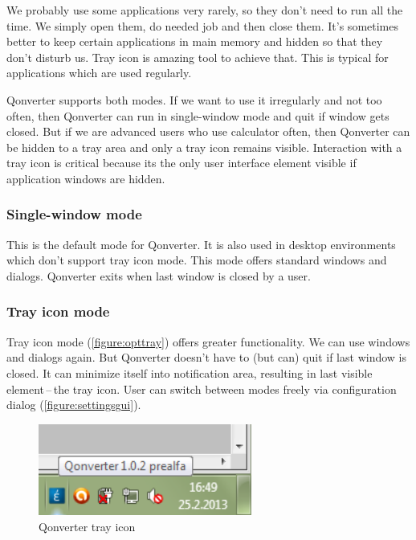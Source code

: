 We probably use some applications very rarely, so they don't need to run all the time. We simply open them, do needed job and then close them. It's sometimes better to keep certain applications in main memory and hidden so that they don't disturb us. Tray icon is amazing tool to achieve that. This is typical for applications which are used regularly.

Qonverter supports both modes. If we want to use it irregularly and not too often, then Qonverter can run in single-window mode and quit if window gets closed. But if we are advanced users who use calculator often, then Qonverter can be hidden to a tray area and only a tray icon remains visible. Interaction with a tray icon is critical because its the only user interface element visible if application windows are hidden.

\subsubsection{Single-window mode}
This is the default mode for Qonverter. It is also used in desktop environments which don't support tray icon mode. This mode offers standard windows and dialogs. Qonverter exits when last window is closed by a user.

\subsubsection{Tray icon mode}
Tray icon mode (\autoref{figure:opttray}) offers greater functionality. We can use windows and dialogs again. But Qonverter doesn't have to (but can) quit if last window is closed. It can minimize itself into notification area, resulting in last visible element\,--\,the tray icon. User can switch between modes freely via configuration dialog (\autoref{figure:settingsgui}).

\begin{figure}[ht]
\begin{center}
\includegraphics[width=7cm]{graphics/real-world/01-tray.png}
\caption{Qonverter tray icon}\label{figure:opttray}
\end{center}
\end{figure}

